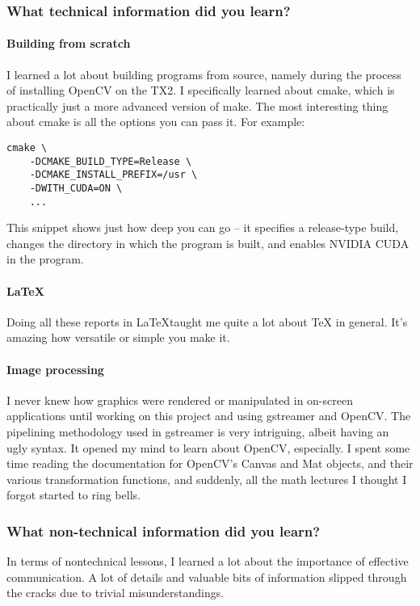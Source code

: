 \subsubsection{What technical information did you learn?}
\paragraph{Building from scratch} I learned a lot about building programs from source, namely during the process of installing OpenCV on the TX2. I specifically learned about cmake, which is practically just a more advanced version of make. The most interesting thing about cmake is all the options you can pass it. For example:
\begin{lstlisting}
cmake \
    -DCMAKE_BUILD_TYPE=Release \
    -DCMAKE_INSTALL_PREFIX=/usr \
    -DWITH_CUDA=ON \
    ...
\end{lstlisting}
This snippet shows just how deep you can go -- it specifies a release-type build, changes the directory in which the program is built, and enables NVIDIA CUDA in the program.

\paragraph{LaTeX} Doing all these reports in \LaTeX taught me quite a lot about TeX in general. It's amazing how versatile or simple you make it.

\paragraph{Image processing}
I never knew how graphics were rendered or manipulated in on-screen applications until working on this project and using gstreamer and OpenCV. The pipelining methodology used in gstreamer is very intriguing, albeit having an ugly syntax. It opened my mind to learn about OpenCV, especially. I spent some time reading the documentation for OpenCV's Canvas and Mat objects, and their various transformation functions, and suddenly, all the math lectures I thought I forgot started to ring bells.

\subsubsection{What non-technical information did you learn?}
In terms of nontechnical lessons, I learned a lot about the importance of effective communication. A lot of details and valuable bits of information slipped through the cracks due to trivial misunderstandings. 

